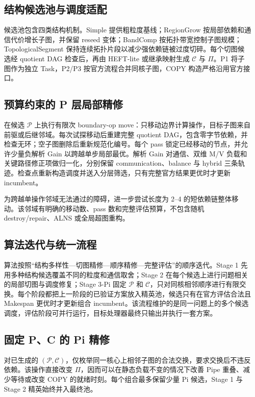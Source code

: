 \documentclass[UTF8,a4paper,11pt]{ctexart}
\newcommand{\PP}{\mathcal{P}}
\newcommand{\CC}{\mathcal{C}}
\newcommand{\PiOrder}{\Pi}
\begin{document}
\subsection{结构候选池与调度适配}
候选池包含四类结构机制。Simple 提供粗粒度基线；RegionGrow 按局部依赖和通信代价增长子图，并保留 reseed 变体；BandComp 按拓扑带宽控制子图规模；TopologicalSegment 保持连续拓扑片段以减少强依赖链被过度切碎。每个切图候选经 quotient DAG 检查后，再由 HEFT-lite 或继承映射生成 $\CC$ 与 $\PiOrder$。P1 将子图作为独立 Task，P2/P3 按官方流程合并同核子图，COPY 构造严格沿用官方接口。

\subsection{预算约束的 P 层局部精修}
在候选 $\PP$ 上执行有限次 boundary-op move：只移动边界计算操作，目标子图来自前驱或后继邻域。每次试探移动后重建完整 quotient DAG，包含零字节依赖，并检查无环；空子图删除后重新规范化编号。每个 pass 锁定已经移动的节点，并允许少量负解析 Gain 以跨越单步局部最优。解析 Gain 对通信、双维 M/V 负载和关键路径修正项做归一化，分别保留 communication、balance 与 hybrid 三条轨迹。检查点重新构造调度并送入分层筛选，只有完整官方结果更优时才更新 incumbent。

为跨越单操作邻域无法通过的障碍，进一步尝试长度为 2--4 的短依赖链整体移动。该邻域有明确的移动数、pass 数和完整评估预算，不包含随机 destroy/repair、ALNS 或全局超图重构。

\subsection{算法迭代与统一流程}
算法按照“结构多样性—切图精修—顺序精修—完整评估”的顺序迭代。Stage 1 先用多种结构候选覆盖不同的粒度和通信取舍；Stage 2 在每个候选上进行问题相关的局部切图与调度修复；Stage 3-Pi 固定 $\PP$ 和 $\CC$，只对同核相邻顺序进行有限交换。每个阶段都把上一阶段的已验证方案放入精英池，候选只有在官方评估合法且 Makespan 更优时才更新组合 incumbent。该流程维护的是同一问题上的多个候选调度，评估阶段可并行运行，目标处理器最终只输出并执行一套方案。

\subsection{固定 P、C 的 Pi 精修}
对已生成的 $(\PP,\CC)$，仅枚举同一核心上相邻子图的合法交换，要求交换后不违反依赖。该操作直接改变 $\PiOrder$，因而可以在静态负载不变的情况下改善 Pipe 重叠、减少等待或改变 COPY 的就绪时刻。每个组合最多保留少量 Pi 候选，Stage 1 与 Stage 2 精英始终并入最终池。
\end{document}
